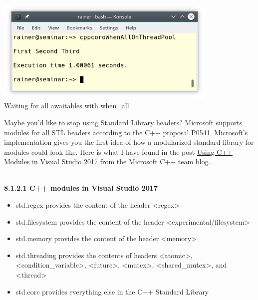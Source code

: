 \begin{center}
\includegraphics[width=0.8\textwidth]{content/5/chapter8/images/6.png}\\
Waiting for all awaitables with when\_all
\end{center}


Maybe you’d like to stop using Standard Library headers? Microsoft supports modules for all STL headers according to the C++ proposal \href{http://www.open-std.org/JTC1/SC22/WG21/docs/papers/2017/p0581r0.pdf}{P0541}. Microsoft’s implementation gives you the first idea of how a modularized standard library for modules could look like. Here is what I have found in the post \href{https://devblogs.microsoft.com/cppblog/cpp-modules-in-visual-studio-2017/}{Using C++ Modules in Visual Studio 2017} from the Microsoft C++ team blog.

\hspace*{\fill} \\ %
\noindent
\textbf{8.1.2.1\hspace{0.2cm} C++ modules in Visual Studio 2017}

\begin{itemize}
\item 
std.regex provides the content of the header <regex>

\item 
std.filesystem provides the content of the header <experimental/filesystem>

\item 
std.memory provides the content of the header <memory>

\item 
std.threading provides the contents of headers <atomic>, <condition\_variable>, <future>, <mutex>, <shared\_mutex>, and <thread>

\item 
std.core provides everything else in the C++ Standard Library
\end{itemize}

